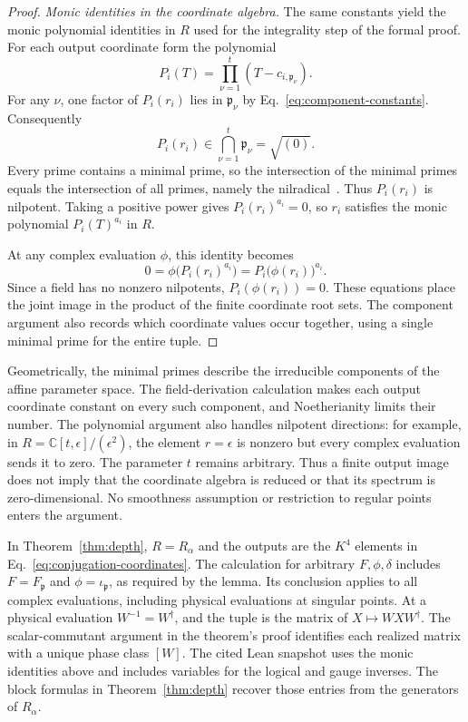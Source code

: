 \documentclass[aps,prl,reprint,notitlepage,nofootinbib,nobibnotes]{revtex4-2}
\begin{document}
\begin{proof}
\emph{Monic identities in the coordinate algebra.}
The same constants yield the monic polynomial identities in \(R\)
used for the integrality step of the formal proof. For each
output coordinate form the polynomial
\[
 P_i(T)=\prod_{\nu=1}^{t}(T-c_{i,\mathfrak p_\nu}).
\]
For any \(\nu\), one factor of \(P_i(r_i)\) lies in
\(\mathfrak p_\nu\) by Eq.~\eqref{eq:component-constants}.
Consequently
\[
 P_i(r_i)\in
 \bigcap_{\nu=1}^{t}\mathfrak p_\nu=\sqrt{(0)}.
\]
Every prime contains a minimal prime, so the intersection of the
minimal primes equals the intersection of all primes, namely the
nilradical~\cite{Stacks}. Thus \(P_i(r_i)\) is nilpotent. Taking a
positive power gives \(P_i(r_i)^{a_i}=0\), so \(r_i\) satisfies
the monic polynomial \(P_i(T)^{a_i}\) in \(R\).

At any complex evaluation \(\phi\), this identity becomes
\[
 0=\phi\bigl(P_i(r_i)^{a_i}\bigr)
   =P_i\bigl(\phi(r_i)\bigr)^{a_i}.
\]
Since a field has no nonzero nilpotents, \(P_i(\phi(r_i))=0\).
These equations place the joint image in the product of the
finite coordinate root sets. The component argument also records
which coordinate values occur together, using a single minimal
prime for the entire tuple.
\end{proof}

Geometrically, the minimal primes describe the irreducible components
of the affine parameter space. The field-derivation calculation makes
each output coordinate constant on every such component, and
Noetherianity limits their number. The polynomial argument also
handles nilpotent directions: for example, in
\(R=\mathbb C[t,\epsilon]/(\epsilon^2)\), the element
\(r=\epsilon\) is nonzero but every complex evaluation sends it to
zero. The parameter \(t\) remains arbitrary. Thus a finite output
image does not imply that the coordinate algebra is reduced or that
its spectrum is zero-dimensional. No smoothness assumption or
restriction to regular points enters the argument.

In Theorem~\ref{thm:depth}, \(R=R_\alpha\) and the outputs are the
\(K^4\) elements in Eq.~\eqref{eq:conjugation-coordinates}.
The calculation for arbitrary \(F,\phi,\delta\) includes
\(F=F_{\mathfrak p}\) and \(\phi=\iota_{\mathfrak p}\), as required
by the lemma. Its conclusion applies to all complex evaluations,
including physical evaluations at singular points. At a physical
evaluation \(W^{-1}=W^\dagger\), and the tuple is the matrix of
\(X\mapsto WXW^\dagger\). The scalar-commutant argument in the
theorem's proof identifies each realized matrix with a unique
phase class \([W]\). The cited Lean snapshot uses the monic
identities above and includes variables for the logical and gauge
inverses. The block formulas in Theorem~\ref{thm:depth} recover
those entries from the generators of \(R_\alpha\).
\end{document}
